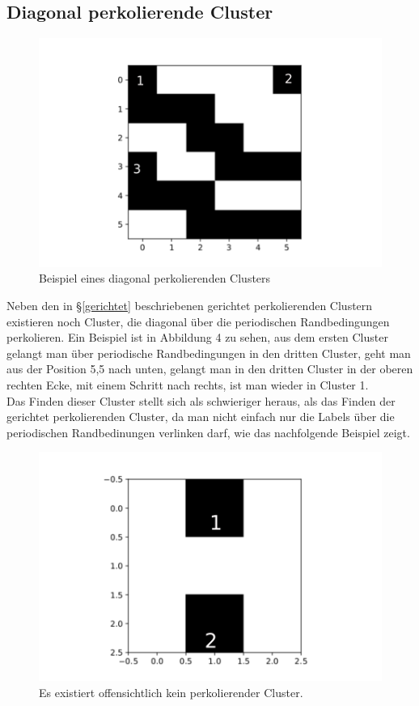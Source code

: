 \documentclass[a4paper, 12pt]{report}
\begin{document}
\subsection{Diagonal perkolierende Cluster}
\begin{figure}[h!]
	\centering
	\includegraphics[scale=0.6]{diagonalperc1.pdf}
	\caption{Beispiel eines diagonal perkolierenden Clusters}
\end{figure}
\vspace{0,5cm}
\noindent Neben den in §\ref{gerichtet} beschriebenen gerichtet perkolierenden Clustern existieren noch Cluster, die diagonal über die periodischen Randbedingungen perkolieren. Ein Beispiel ist in Abbildung 4 zu sehen, aus dem ersten Cluster gelangt man über periodische Randbedingungen in den dritten Cluster, geht man aus der Position 5,5 nach unten, gelangt man in den dritten Cluster in der oberen rechten Ecke, mit einem Schritt nach rechts, ist man wieder in Cluster 1.
\\
\noindent Das Finden dieser Cluster stellt sich als schwieriger heraus, als das Finden der gerichtet perkolierenden Cluster, da man nicht einfach nur die Labels über die periodischen Randbedinungen verlinken darf, wie das nachfolgende Beispiel zeigt.
\begin{figure}[h!]
	\centering
	\includegraphics[scale=0.6]{noperc1.pdf}
	\caption{Es existiert offensichtlich kein perkolierender Cluster.}
\end{figure}
\end{document}
